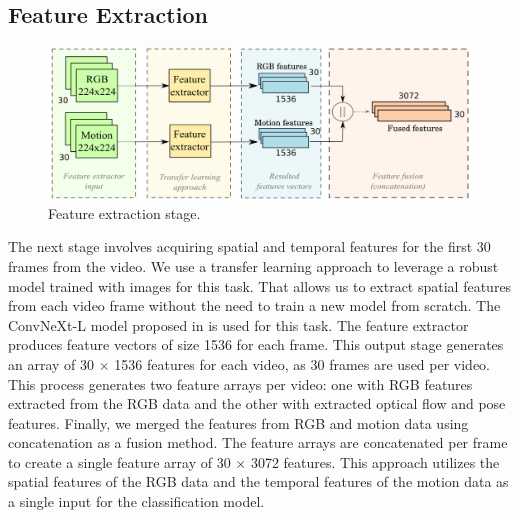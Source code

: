 \documentclass[mathematics,article,submit,pdftex,moreauthors]{Definitions/mdpi}
\begin{document}

\subsection{Feature Extraction}
\label{sub:feature}
\begin{figure}[!ht]
     \centering
     \includegraphics[width=1\textwidth]{Definitions/feature_extraction.png}
     \caption{Feature extraction stage. \label{fig:feature_extraction}}     
\end{figure}
The next stage involves acquiring spatial and temporal features for the first 30 frames from the video. We use a transfer learning approach to leverage a robust model trained with images for this task. That allows us to extract spatial features from each video frame without the need to train a new model from scratch. The ConvNeXt-L model proposed in \cite{liu2022convnet} is used for this task. The feature extractor produces feature vectors of size 1536 for each frame. This output stage generates an array of 30 $\times$ 1536 features for each video, as 30 frames are used per video. This process generates two feature arrays per video: one with RGB features extracted from the RGB data and the other with extracted optical flow and pose features. 
Finally, we merged the features from RGB and motion data using concatenation as a fusion method. The feature arrays are concatenated per frame to create a single feature array of 30 $\times$ 3072 features. This approach utilizes the spatial features of the RGB data and the temporal features of the motion data as a single input for the classification model. 
\end{document}
